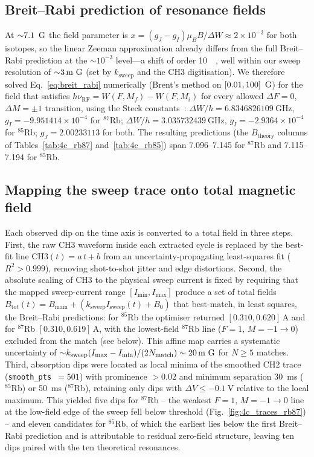 \subsection{Breit--Rabi prediction of resonance fields}
At ${\sim}\SI{7.1}{\gauss}$ the field parameter is
$x = (g_J - g_I)\mu_B B/\Delta W \approx 2\times 10^{-3}$ for both
isotopes, so the linear Zeeman approximation already differs from the full
Breit--Rabi prediction at the ${\sim}10^{-3}$ level---a shift of order
\SI{10}{\milli\gauss}, well within our sweep resolution of
${\sim}\SI{3}{\milli\gauss}$ (set by $k_{\mathrm{sweep}}$ and the CH3
digitisation). We therefore solved Eq.~\ref{eq:breit_rabi} numerically
(Brent's method on $[0.01,100]\,\si{\gauss}$) for the field that satisfies
$h\nu_{\mathrm{RF}} = W(F,M_f) - W(F,M_i)$ for every allowed
$\Delta F=0$, $\Delta M=\pm 1$ transition, using the Steck
constants~\cite{OPTOpticalPumping2024}: $\Delta W/h =
\SI{6.8346826109}{\giga\hertz}$, $g_I = -9.951414\times 10^{-4}$ for
$^{87}$Rb; $\Delta W/h = \SI{3.035732439}{\giga\hertz}$,
$g_I = -2.9364\times 10^{-4}$ for $^{85}$Rb; $g_J = 2.00233113$ for both.
The resulting predictions (the $B_{\mathrm{theory}}$ columns of
Tables~\ref{tab:4c_rb87} and~\ref{tab:4c_rb85}) span
\SIrange{7.096}{7.145}{\gauss} for $^{87}$Rb and
\SIrange{7.115}{7.194}{\gauss} for $^{85}$Rb.

\subsection{Mapping the sweep trace onto total magnetic field}
Each observed dip on the time axis is converted to a total field in three
steps. First, the raw CH3 waveform inside each extracted cycle is replaced
by the best-fit line $\mathrm{CH3}(t) = a\,t + b$ from an
uncertainty-propagating least-squares fit ($R^2>0.999$), removing
shot-to-shot jitter and edge distortions. Second, the absolute scaling of
CH3 to the physical sweep current is fixed by requiring that the mapped
sweep-current range $[I_{\min}, I_{\max}]$ produce a set of total fields
$B_{\mathrm{tot}}(t) = B_{\mathrm{main}} + (k_{\mathrm{sweep}}
I_{\mathrm{sweep}}(t) + B_0)$ that best-match, in least squares, the
Breit--Rabi predictions: for $^{85}$Rb the optimiser returned
$[0.310,0.620]\,\si{\ampere}$ and for $^{87}$Rb
$[0.310,0.619]\,\si{\ampere}$, with the lowest-field $^{87}$Rb line
($F=1,\,M=-1\!\to\!0$) excluded from the match (see below). This affine
map carries a systematic uncertainty of
${\sim}k_{\mathrm{sweep}}(I_{\max}-I_{\min})/(2N_{\mathrm{match}}) \sim
\SI{20}{\milli\gauss}$ for $N\ge 5$ matches. Third, absorption dips were
located as local minima of the smoothed CH2 trace
(\texttt{smooth\_pts}~$=501$) with prominence $>0.02$ and minimum
separation \SI{30}{\milli\second} ($^{85}$Rb) or \SI{50}{\milli\second}
($^{87}$Rb), retaining only dips with $\Delta V \le \SI{-0.1}{\volt}$
relative to the local maximum. This yielded five dips for $^{87}$Rb --
the weakest $F=1,\,M=-1\!\to\!0$ line at the low-field edge of the sweep
fell below threshold (Fig.~\ref{fig:4c_traces_rb87}) -- and eleven
candidates for $^{85}$Rb, of which the earliest lies below the first
Breit--Rabi prediction and is attributable to residual zero-field
structure, leaving ten dips paired with the ten theoretical resonances.

